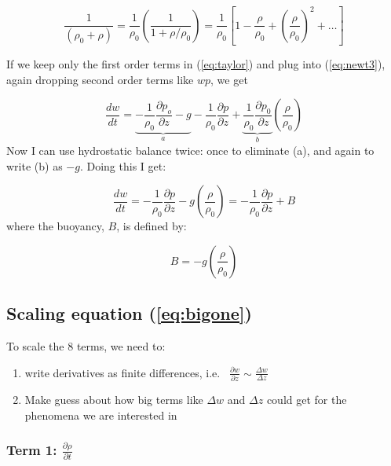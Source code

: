\documentclass[12pt]{article}
\begin{document}
\begin{equation}
  \label{eq:taylor}
  \frac{ 1}{(\rho_0 + \rho)} = \frac{ 1}{\rho_0} 
\left ( \frac{ 1}{1 + \rho/\rho_0}   \right ) = 
\frac{ 1}{\rho_0} \left [ 1 - \frac{ \rho}{\rho_0} + 
\left ( \frac{ \rho}{\rho_0} \right )^2 + \ldots \right ]
\end{equation}


If we keep only the first order terms in (\ref{eq:taylor}) and plug into
(\ref{eq:newt3}), again dropping second order terms like $wp$,
we get
 

\begin{equation}
  \label{eq:newt4}
   \frac{ dw}{dt}  = \underbrace{- \frac{1 }{\rho_0} 
\frac{ \partial p_o }{\partial z} -  g}_a
- \frac{1 }{\rho_0} \frac{ \partial p }{\partial z} +
 \underbrace{\frac{1 }{\rho_0} \frac{ \partial p_0 }{\partial z}}_b \left ( \frac{ \rho}{\rho_0} \right )
\end{equation}
Now I can use hydrostatic balance twice: once to eliminate (a), and again
to write (b) as $-g$.  Doing this I get:


\begin{equation}
  \label{eq:newt5}
   \frac{ dw}{dt}  = - \frac{1 }{\rho_0} \frac{ \partial p }{\partial z} 
- g \left ( \frac{ \rho}{\rho_0} \right ) =
- \frac{1 }{\rho_0} \frac{ \partial p }{\partial z} 
+ B
\end{equation}
where the buoyancy, $B$, is defined by:

\begin{equation}
  \label{eq:B}
B = - g \left ( \frac{ \rho}{\rho_0} \right )
\end{equation}


\subsection{Scaling equation (\ref{eq:bigone})}


To scale the 8 terms, we need to:

\begin{enumerate}
\item write derivatives as finite differences, i.e.~ $\frac{\partial w }{\partial z}  \sim \frac{ \Delta w}{\Delta z}$
\item Make guess about how big terms like $\Delta w$ and $\Delta z$ could
get for the phenomena we are interested in
\end{enumerate}


\subsubsection{Term 1:  $\frac{\partial \rho }{    \partial t}$}
\label{sec:term-1}
\end{document}

